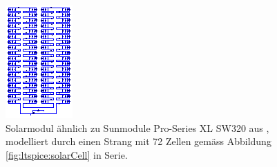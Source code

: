 \begin{figure}[h!tb]
    \centering
    \includegraphics[width=\textwidth]{images/ltspice/module-72cells-series.eps}
    \caption{%
        Solarmodul   \"ahnlich   zu   Sunmodule  Pro-Series   XL   SW320   aus
        \cite{ref:solar:sunmodulePro},  modelliert durch  einen Strang  mit 72
        Zellen gem\"ass Abbildung \ref{fig:ltspice:solarCell} in Serie.%
    }
    \label{fig:ltspice:module:cellBased:72x1}
\end{figure}
